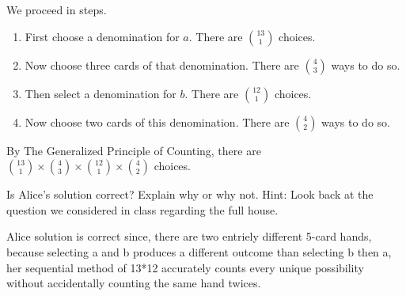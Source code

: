 \documentclass[12pt]{article}
\begin{document}
\begin{enumerate}
{\begin{tcolorbox}
We proceed in steps. 

\begin{enumerate}
    \item First choose a denomination for $a$. There are $\binom{13}{1}$ choices.
    \item Now choose three cards of that denomination. There are $\binom{4}{3}$ ways to do so.
    \item Then select a denomination for $b$. There are $\binom{12}{1}$ choices.
    \item Now choose two cards of this denomination. There are $\binom{4}{2}$ ways to do so.
\end{enumerate}

By The Generalized Principle of Counting, there are $ \binom{13}{1} \times \binom{4}{3} \times \binom{12}{1} \times \binom{4}{2}$ choices.

\end{tcolorbox}

Is Alice's solution correct? Explain why or why not. Hint: Look back at the question we considered in class regarding the full house.}

Alice solution is correct since, there are two entriely different 5-card hands, because selecting a and b produces a different outcome than selecting b then a, her sequential method of 13*12 accurately counts every unique possibility without accidentally counting the same hand twices. 
 
\end{enumerate}
\end{document}
